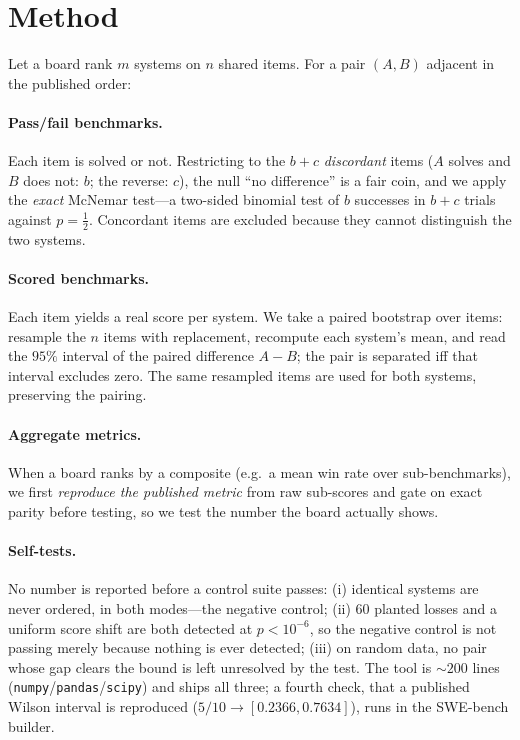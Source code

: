 \documentclass[11pt]{article}
\begin{document}
\section{Method}
\label{sec:method}
Let a board rank $m$ systems on $n$ shared items. For a pair $(A,B)$ adjacent in the published order:

\paragraph{Pass/fail benchmarks.} Each item is solved or not. Restricting to the $b+c$ \emph{discordant}
items ($A$ solves and $B$ does not: $b$; the reverse: $c$), the null ``no difference'' is a fair coin,
and we apply the \emph{exact} McNemar test---a two-sided binomial test of $b$ successes in $b+c$
trials against $p=\tfrac12$. Concordant items are excluded because they cannot distinguish the two
systems.

\paragraph{Scored benchmarks.} Each item yields a real score per system. We take a paired bootstrap
over items: resample the $n$ items with replacement, recompute each system's mean, and read the
$95\%$ interval of the paired difference $A-B$; the pair is separated iff that interval excludes zero.
The same resampled items are used for both systems, preserving the pairing.

\paragraph{Aggregate metrics.} When a board ranks by a composite (e.g.\ a mean win rate over
sub-benchmarks), we first \emph{reproduce the published metric} from raw sub-scores and gate on exact
parity before testing, so we test the number the board actually shows.

\paragraph{Self-tests.} No number is reported before a control suite passes: (i) identical systems are
never ordered, in both modes---the negative control; (ii) $60$ planted losses and a uniform score
shift are both detected at $p<10^{-6}$, so the negative control is not passing merely because nothing
is ever detected; (iii) on random data, no pair whose gap clears the bound is left unresolved by
the test. The tool is $\sim\!200$ lines (\texttt{numpy}/\texttt{pandas}/\texttt{scipy}) and ships all
three; a fourth check, that a published Wilson interval is reproduced ($5/10 \to [0.2366, 0.7634]$),
runs in the SWE-bench builder.
\end{document}

